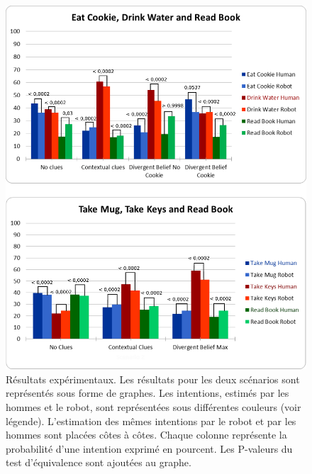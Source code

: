\documentclass[a4paper,11pt,twoside]{StyleThese}
\begin{document}
 \begin{figure}[h!]
	\centering
	\includegraphics[clip,scale=0.52]{img/pvalues1.pdf}
	\caption{Résultats expérimentaux. Les résultats pour les deux scénarios sont représentés sous forme de graphes. Les intentions, estimés par les hommes et le robot, sont représentées sous différentes couleurs (voir légende). L'estimation des mêmes intentions par le robot et par les hommes sont placées côtes à côtes. Chaque colonne représente la probabilité d'une intention exprimé en pourcent. Les P-valeurs du test d'équivalence sont ajoutées au graphe.}
	\label{fig:user_study_results}
  	\vspace{-16pt}
\end{figure}


\ifdefined{}
\else


\end{document}
